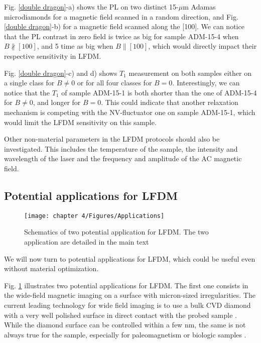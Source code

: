 \documentclass[a4paper, 11pt]{report}
\begin{document}
Fig. \ref{double dragon}-a) shows the PL on two distinct 15-$\mu$m Adamas microdiamonds for a magnetic field scanned in a random direction, and Fig. \ref{double dragon}-b) for a magnetic field scanned along the [100]. We can notice that the PL contrast in zero field is twice as big for sample ADM-15-4 when $B \nparallel [100]$, and 5 time as big when $B \parallel [100]$, which would directly impact their respective sensitivity in LFDM.

Fig. \ref{double dragon}-c) and d) shows $T_1$ measurement on both samples either on a single class for $B\neq 0$ or for all four classes for $B=0$. Interestingly, we can notice that the $T_1$ of sample ADM-15-1 is both shorter than the one of ADM-15-4 for $B\neq 0$, and longer for $B=0$. This could indicate that another relaxation mechanism is competing with the NV-fluctuator one on sample ADM-15-1, which would limit the LFDM sensitivity on this sample.

Other non-material parameters in the LFDM protocols should also be investigated. This includes the temperature of the sample, the intensity and wavelength of the laser and the frequency and amplitude of the AC magnetic field. 

\subsection{Potential applications for LFDM}

\begin{figure}[h!]
\centering
\texttt{[image: chapter 4/Figures/Applications]}
\caption{Schematics of two potential application for LFDM. The two application are detailed in the main text}
\label{applications}
\end{figure}

We will now turn to potential applications for LFDM, which could be useful even without material optimization.

Fig. \ref{applications} illustrates two potential applications for LFDM. The first one consists in the wide-field magnetic imaging on a surface with micron-sized irregularities. The current leading technology for wide field imaging is to use a bulk CVD diamond with a very well polished surface in direct contact with the probed sample \citep{levine2019principles, scholten2021widefield}. While the diamond surface can be controlled within a few nm, the same is not always true for the sample, especially for paleomagnetism or biologic samples \citep{scholten2021widefield}. 
\end{document}
